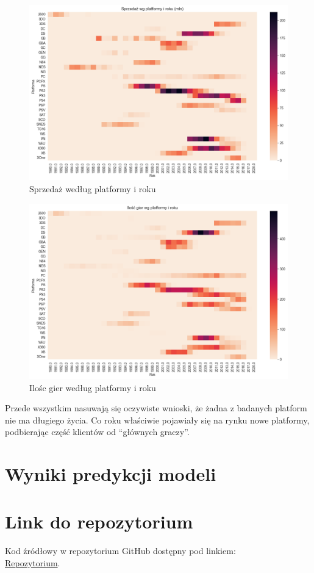 \documentclass[11pt]{article}
\begin{document}
\begin{figure}[H]
    \centering
    \includegraphics{figures/rokplatforma-sprzedaz}
    \caption{Sprzedaż według platformy i roku}
    \label{fig:platform-year-sales}
\end{figure}

\begin{figure}[H]
    \centering
    \includegraphics{figures/rokplatforma-ilosc}
    \caption{Ilośc gier według platformy i roku}
    \label{fig:platform-year-count}
\end{figure}

Przede wszystkim nasuwają się oczywiste wnioski, że żadna z badanych platform nie ma długiego życia.
Co roku właściwie pojawiały się na rynku nowe platformy, podbierając część klientów od ``głównych graczy''.



\section{Wyniki predykcji modeli}\label{sec:wyniki-predykcji-modeli}


\section{Link do repozytorium}\label{sec:link-do-repo}
Kod źródłowy w repozytorium GitHub dostępny pod linkiem: \\
\href{https://github.com/KotZPolibudy/PUT_SUS/zdataset-analiza}{Repozytorium}.
\end{document}
